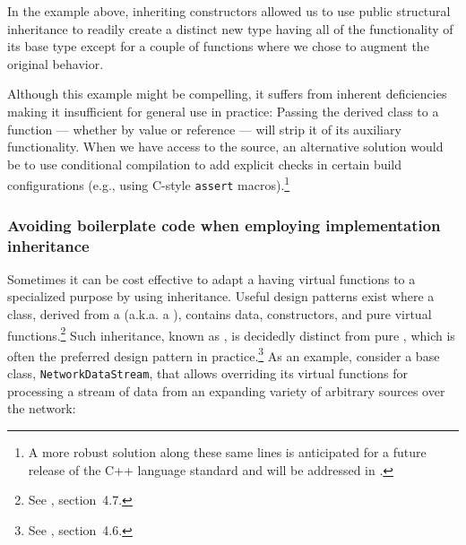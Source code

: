 \noindent In the example above, inheriting constructors allowed us to use public
structural inheritance to readily create a distinct new type having
all of the functionality of its base type except for a couple of
functions where we chose to augment the original behavior.

Although this example might be compelling, it suffers from inherent deficiencies making it insufficient for general use in practice: Passing the derived class to a function --- whether by value or reference --- will
strip it of its auxiliary functionality. When we have access to the source, an alternative solution would be to use conditional compilation to add explicit checks in certain build configurations (e.g., using C-style \lstinline!assert! macros).{\cprotect\footnote{A more robust solution along these same lines is anticipated for a future release of the C++ language standard and will be addressed in \cite{lakos23}.}} 

\subsubsection[Avoiding boilerplate code when employing implementation inheritance]{Avoiding boilerplate code when employing implementation inheritance}\label{avoiding-boilerplate-code-when-employing-implementation-inheritance}

Sometimes it can be cost effective to adapt a 
having virtual functions to a specialized purpose
by using inheritance. Useful design patterns
exist where a  class, derived from a
 (a.k.a. a ), contains data,
constructors, and pure virtual functions.\footnote{See
  \cite{lakos2a}, section~4.7.} Such inheritance, known as
, is decidedly distinct from pure , which is often the preferred design
  pattern in practice.\footnote{See \cite{lakos2b}, section~4.6.} As an example, consider a base class,
\lstinline!NetworkDataStream!, that allows overriding its virtual functions
for processing a stream of data from an expanding variety of arbitrary
sources over the network:

